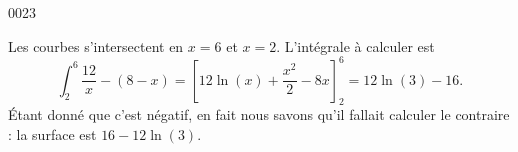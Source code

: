 \begin{corrige}{0023}

Les courbes s'intersectent en $x=6$ et $x=2$. L'intégrale à calculer est
\begin{equation}
	\int_2^6\frac{ 12 }{ x }-(8-x)=\left[ 12\ln(x)+\frac{ x^2 }{ 2 }-8x \right]_2^6=12\ln(3)-16.
\end{equation}
Étant donné que c'est négatif, en fait nous savons qu'il fallait calculer le contraire : la surface est $16-12\ln(3)$.

\end{corrige}
